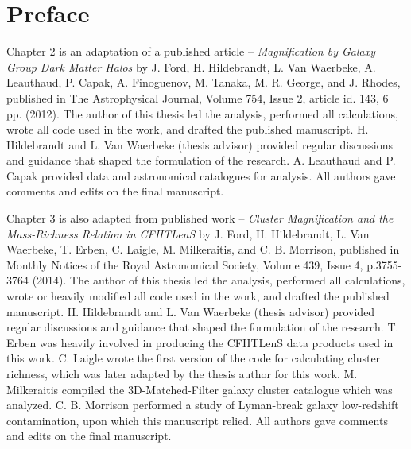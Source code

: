 
\chapter{Preface}

Chapter 2 is an adaptation of a published article -- {\it Magnification by Galaxy Group Dark Matter Halos} by J. Ford, H. Hildebrandt, L. Van Waerbeke, A. Leauthaud, P. Capak, A. Finoguenov, M. Tanaka, M. R. George, and J. Rhodes, published in The Astrophysical Journal, Volume 754, Issue 2, article id. 143, 6 pp. (2012). The author of this thesis led the analysis, performed all calculations, wrote all code used in the work, and drafted the published manuscript. H. Hildebrandt and L. Van Waerbeke (thesis advisor) provided regular discussions and guidance that shaped the formulation of the research. A. Leauthaud and P. Capak provided data and astronomical catalogues for analysis. All authors gave comments and edits on the final manuscript.


Chapter 3 is also adapted from published work -- {\it Cluster Magnification and the Mass-Richness Relation in CFHTLenS} by J. Ford, H. Hildebrandt, L. Van Waerbeke, T. Erben, C. Laigle, M. Milkeraitis, and C. B. Morrison, published in Monthly Notices of the Royal Astronomical Society, Volume 439, Issue 4, p.3755-3764 (2014). The author of this thesis led the analysis, performed all calculations, wrote or heavily modified all code used in the work, and drafted the published manuscript. H. Hildebrandt and L. Van Waerbeke (thesis advisor) provided regular discussions and guidance that shaped the formulation of the research. T. Erben was heavily involved in producing the CFHTLenS data products used in this work. C. Laigle wrote the first version of the code for calculating cluster richness, which was later adapted by the thesis author for this work. M. Milkeraitis compiled the 3D-Matched-Filter galaxy cluster catalogue which was analyzed. C. B. Morrison performed a study of Lyman-break galaxy low-redshift contamination, upon which this manuscript relied. All authors gave comments and edits on the final manuscript.


